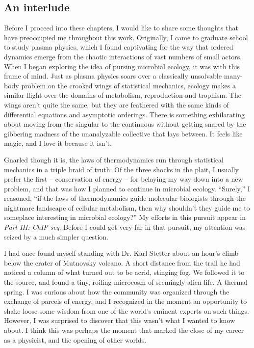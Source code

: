 \subsection*{An interlude}

Before I proceed into these chapters, I would like to share some thoughts that have preoccupied me throughout this work. Originally, I came to graduate school to study plasma physics, which I found captivating for the way that ordered dynamics emerge from the chaotic interactions of vast numbers of small actors. When I began exploring the idea of pursing microbial ecology, it was with this frame of mind. Just as plasma physics soars over a classically unsolvable many-body problem on the crooked wings of statistical mechanics, ecology makes a similar flight over the domains of metabolism, reproduction and trophism. The wings aren't quite the same, but they are feathered with the same kinds of differential equations and asymptotic orderings. There is something exhilarating about moving from the singular to the continuous without getting snared by the gibbering madness of the unanalyzable collective that lays between. It feels like magic, and I love it because it isn't.

Gnarled though it is, the laws of thermodynamics run through statistical mechanics in a triple braid of truth. Of the three shocks in the plait, I usually prefer the first -- conservation of energy -- for belaying my way down into a new problem, and that was how I planned to continue in microbial ecology. ``Surely,'' I reasoned, ``if the laws of thermodynamics guide molecular biologists through the nightmare landscape of cellular metabolism, then why shouldn't they guide me to someplace interesting in microbial ecology?'' My efforts in this pursuit appear in {\em Part III: ChIP-seq}. Before I could get very far in that pursuit, my attention was seized by a much simpler question.

I had once found myself standing with Dr. Karl Stetter about an hour's climb below the crater of Mutnovsky volcano. A short distance from the trail he had noticed a column of what turned out to be acrid, stinging fog. We followed it to the source, and found a tiny, roiling microcosm of seemingly alien life. A thermal spring. I was curious about how the community was organized through the exchange of parcels of energy, and I recognized in the moment an opportunity to shake loose some wisdom from one of the world's eminent experts on such things. However, I was surprised to discover that this wasn't what I wanted to know about. I think this was perhaps the moment that marked the close of my career as a physicist, and the opening of other worlds.

